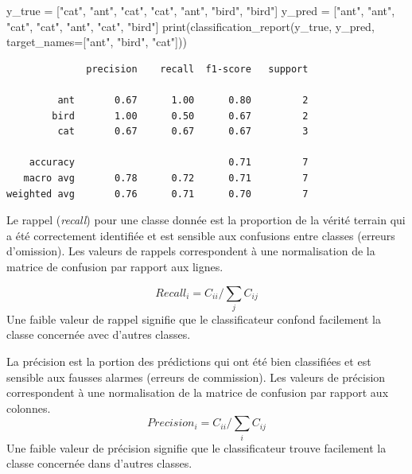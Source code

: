 \documentclass[
  11pt,
  letterpaper,
  open=any,
  twoside=false,
  french]{scrbook}
\newenvironment{Shaded}{\begin{snugshade}}{\end{snugshade}}
\newcommand{\BuiltInTok}[1]{\textcolor[rgb]{0.00,0.23,0.31}{#1}}
\newcommand{\NormalTok}[1]{\textcolor[rgb]{0.00,0.23,0.31}{#1}}
\newcommand{\OperatorTok}[1]{\textcolor[rgb]{0.37,0.37,0.37}{#1}}
\newcommand{\StringTok}[1]{\textcolor[rgb]{0.13,0.47,0.30}{#1}}
\begin{document}
\begin{Shaded}
\begin{Highlighting}[]
\NormalTok{y\_true }\OperatorTok{=}\NormalTok{ [}\StringTok{"cat"}\NormalTok{, }\StringTok{"ant"}\NormalTok{, }\StringTok{"cat"}\NormalTok{, }\StringTok{"cat"}\NormalTok{, }\StringTok{"ant"}\NormalTok{, }\StringTok{"bird"}\NormalTok{, }\StringTok{"bird"}\NormalTok{]}
\NormalTok{y\_pred }\OperatorTok{=}\NormalTok{ [}\StringTok{"ant"}\NormalTok{, }\StringTok{"ant"}\NormalTok{, }\StringTok{"cat"}\NormalTok{, }\StringTok{"cat"}\NormalTok{, }\StringTok{"ant"}\NormalTok{, }\StringTok{"cat"}\NormalTok{, }\StringTok{"bird"}\NormalTok{]}
\BuiltInTok{print}\NormalTok{(classification\_report(y\_true, y\_pred, target\_names}\OperatorTok{=}\NormalTok{[}\StringTok{"ant"}\NormalTok{, }\StringTok{"bird"}\NormalTok{, }\StringTok{"cat"}\NormalTok{]))}
\end{Highlighting}
\end{Shaded}

\begin{verbatim}
              precision    recall  f1-score   support

         ant       0.67      1.00      0.80         2
        bird       1.00      0.50      0.67         2
         cat       0.67      0.67      0.67         3

    accuracy                           0.71         7
   macro avg       0.78      0.72      0.71         7
weighted avg       0.76      0.71      0.70         7
\end{verbatim}

Le rappel (\emph{recall}) pour une classe donnée est la proportion de la
vérité terrain qui a été correctement identifiée et est sensible aux
confusions entre classes (erreurs d'omission). Les valeurs de rappels
correspondent à une normalisation de la matrice de confusion par rapport
aux lignes.

\[
Recall_i= C_{ii} / \sum_j C_{ij}
\] Une faible valeur de rappel signifie que le classificateur confond
facilement la classe concernée avec d'autres classes.

La précision est la portion des prédictions qui ont été bien classifiées
et est sensible aux fausses alarmes (erreurs de commission). Les valeurs
de précision correspondent à une normalisation de la matrice de
confusion par rapport aux colonnes. \[
Precision_i= C_{ii} / \sum_i C_{ij}
\] Une faible valeur de précision signifie que le classificateur trouve
facilement la classe concernée dans d'autres classes.
\end{document}
